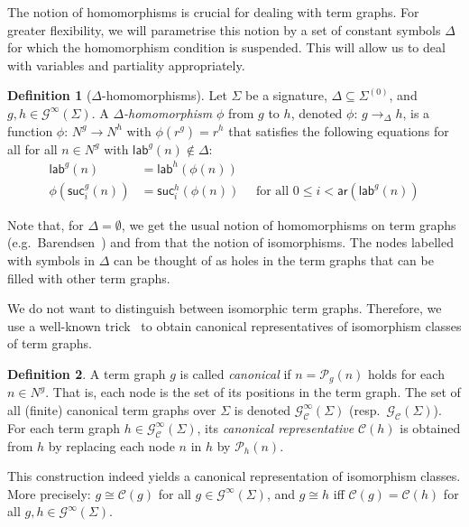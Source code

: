 \documentclass[copyright,creativecommons,UKenglish,final]{eptcs}
\newcommand\canon[1]{\calC(#1)}
\newcommand\isom{\cong}
\newcommand\calC{\mathcal{C}}
\newcommand\calG{\mathcal{G}}
\newcommand\calP{\mathcal{P}}
\newcommand\calPos{\calP}
\newcommand\fcolon{\colon\,}
\newcommand\funto{\rightarrow}
\newcommand\srank[1]{\symb{ar}(#1)}
\newcommand\nin{\not\in}
\newcommand\homto{\rightarrow}
\newcommand\nodePos[2]{\calPos_{#1}(#2)}
\newcommand\itgraphs[1][\Sigma]{\calG^\infty(#1)}
\newcommand\ctgraphs[1][\Sigma]{\calG_\calC(#1)}
\newcommand\ictgraphs[1][\Sigma]{\calG^\infty_\calC(#1)}
\newcommand\symb[1]{\mathsf{#1}}
\newcommand\glab{\symb{lab}}
\newcommand\gsuc{\symb{suc}}
\theoremstyle{definition}
\newtheorem{definition}{Definition}[section]
\theoremstyle{plain}
\begin{document}
The notion of homomorphisms is crucial for dealing with term
graphs. For greater flexibility, we will parametrise this notion by a
set of constant symbols $\Delta$ for which the homomorphism condition
is suspended. This will allow us to deal with variables and partiality
appropriately.
\begin{definition}[$\Delta$-homomorphisms]
  \label{def:D-hom}
Let $\Sigma$ be a signature, $\Delta\subseteq \Sigma^{(0)}$, and
  $g,h \in \itgraphs$. A \emph{$\Delta$-homomorphism} $\phi$ from $g$
  to $h$, denoted $\phi\fcolon g \homto_\Delta h$, is a function
  $\phi\fcolon N^g \funto N^h$ with $\phi(r^g) = r^h$ that satisfies
  the following equations for all for all $n \in N^g$ with $\glab^g(n)
  \nin \Delta$:
  \begin{align*}
    \glab^g(n) &= \glab^h(\phi(n))
    \tag{labelling}\\
    \phi(\gsuc^g_i(n)) &= \gsuc^h_i(\phi(n)) \quad \text{ for all } 0 \le i <
    \srank{\glab^g(n)} \tag{successor}
  \end{align*}
\end{definition}

Note that, for $\Delta = \emptyset$, we get the usual notion of
homomorphisms on term graphs (e.g.\ Barendsen~\cite{barendsen03book})
and from that the notion of isomorphisms. The nodes labelled with
symbols in $\Delta$ can be thought of as holes in the term graphs that
can be filled with other term graphs.

We do not want to distinguish between isomorphic term
graphs. Therefore, we use a well-known trick~\cite{plump99hggcbgt} to
obtain canonical representatives of isomorphism classes of term
graphs.
\begin{definition}\label{def:canTgraph}
A term graph $g$ is called \emph{canonical} if $n = \nodePos{g}{n}$
  holds for each $n \in N^g$. That is, each node is the set of its
  positions in the term graph. The set of all (finite) canonical term
  graphs over $\Sigma$ is denoted $\ictgraphs$ (resp.\
  $\ctgraphs$). For each term graph $h \in \ictgraphs$, its
  \emph{canonical representative} $\canon{h}$ is obtained from $h$ by
  replacing each node $n$ in $h$ by $\nodePos{h}{n}$.

\end{definition}

This construction indeed yields a canonical representation of
isomorphism classes. More precisely: $g \isom \canon g$ for all
$g\in\itgraphs$, and $g \isom h$ iff $\canon g = \canon h$ for all
$g,h \in \itgraphs$.
\end{document}
